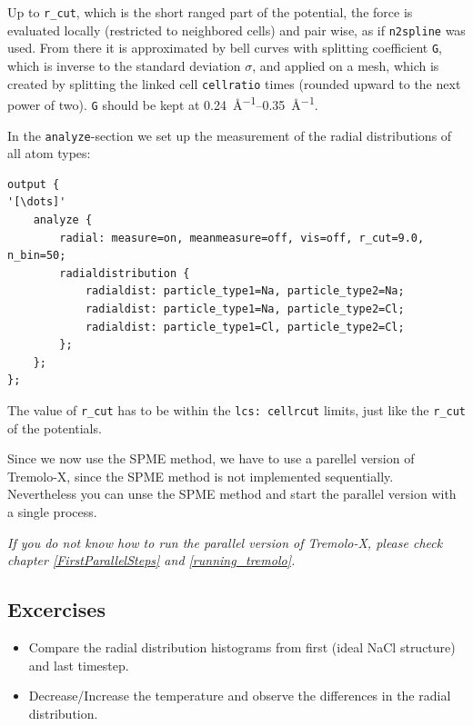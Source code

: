 Up to \texttt{r\_cut}, which is the short ranged part of the potential,
the force is evaluated locally (restricted to neighbored cells) and pair
wise, as if \texttt{n2spline} was used. From there it is approximated by
bell curves with splitting coefficient
\texttt{G}, which is inverse to the standard deviation $\sigma$, and
applied on a mesh, which is created by splitting the linked cell
\texttt{cellratio} times (rounded upward to the next power of two).
\texttt{G} should be kept at \SIrange{0.24}{0.35}{\angstrom^{-1}}.

In the \texttt{analyze}-section we set up the measurement of the radial
distributions of all atom types:

\begin{lstlisting}[escapechar=']
output {
'[\dots]'
    analyze {
        radial: measure=on, meanmeasure=off, vis=off, r_cut=9.0, n_bin=50;
        radialdistribution {
            radialdist: particle_type1=Na, particle_type2=Na;
            radialdist: particle_type1=Na, particle_type2=Cl;
            radialdist: particle_type1=Cl, particle_type2=Cl;
        };
    };
};
\end{lstlisting}

The value of \texttt{r\_cut} has to be within the \texttt{lcs: cellrcut}
limits, just like the \texttt{r\_cut} of the potentials.

Since we now use the SPME method, we have to use a parellel version
of Tremolo-X, since the SPME method is not implemented sequentially.
Nevertheless you can unse the SPME method and start the parallel 
version with a single process.

\emph{If you do not know how to run the parallel version of Tremolo-X,
please check chapter \ref{FirstParallelSteps} and \ref{running_tremolo}.}

\subsection{Excercises}
\begin{itemize}
    \item Compare the radial distribution histograms from first (ideal
        NaCl structure) and last timestep.
    \item Decrease/Increase the temperature and observe the differences
        in the radial distribution.
\end{itemize}

